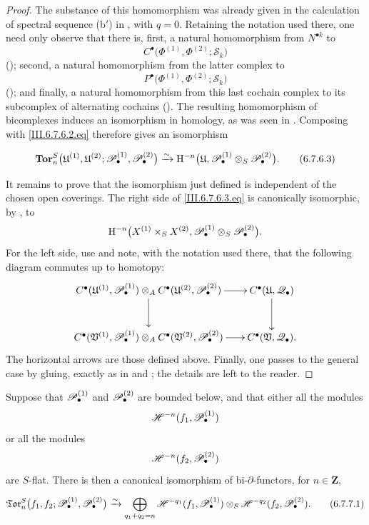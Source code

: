 \begin{proof}
The substance of this homomorphism was already given in the
calculation of spectral sequence \textnormal{(b$'$)} in
, with $q=0$.  Retaining the notation used
there, one need only observe that there is, first, a natural
homomorphism from $N^{\bullet k}$ to
\[
  C^\bullet
  \bigl(
    \Phi^{(1)},\Phi^{(2)};\mathcal S_k
  \bigr)
\]
(); second, a natural homomorphism from the
latter complex to
\[
  P^\bullet
  \bigl(
    \Phi^{(1)},\Phi^{(2)};\mathcal S_k
  \bigr)
\]
(); and finally, a natural homomorphism from
this last cochain complex to its subcomplex of alternating
cochains ().  The resulting homomorphism of
bicomplexes induces an isomorphism in homology, as was seen in
.  Composing with
\eqref{III.6.7.6.2.eq} therefore gives an isomorphism
\begin{env}[6.7.6.3]
\label{III.6.7.6.3}
\[
  \mathbf{Tor}_n^S
  \bigl(
    \mathfrak U^{(1)},\mathfrak U^{(2)};
    \mathscr{P}_\bullet^{(1)},\mathscr{P}_\bullet^{(2)}
  \bigr)
  \xrightarrow{\sim}
  \mathrm{H}^{-n}
  \bigl(
    \mathfrak U,
    \mathscr{P}_\bullet^{(1)}
    \otimes_S\mathscr{P}_\bullet^{(2)}
  \bigr).
  \tag{6.7.6.3}\label{III.6.7.6.3.eq}
\]
\end{env}

It remains to prove that the isomorphism just defined is
independent of the chosen open coverings.  The right side of
\eqref{III.6.7.6.3.eq} is canonically isomorphic, by
, to
\[
  \mathrm{H}^{-n}
  \bigl(
    X^{(1)}\times_SX^{(2)},
    \mathscr{P}_\bullet^{(1)}
    \otimes_S\mathscr{P}_\bullet^{(2)}
  \bigr).
\]
For the left side, use  and note, with the
notation used there, that the following diagram commutes up to
homotopy:
\[
\xymatrix@C=18pt@R=28pt{
  C^\bullet(\mathfrak U^{(1)},\sh P_\bullet^{(1)})
  \otimes_A
  C^\bullet(\mathfrak U^{(2)},\sh P_\bullet^{(2)})
  \ar[r]\ar[d]
  &
  C^\bullet(\mathfrak U,\sh Q_\bullet)
  \ar[d]
  \\
  C^\bullet(\mathfrak V^{(1)},\sh P_\bullet^{(1)})
  \otimes_A
  C^\bullet(\mathfrak V^{(2)},\sh P_\bullet^{(2)})
  \ar[r]
  &
  C^\bullet(\mathfrak V,\sh Q_\bullet).
}
\]
The horizontal arrows are those defined above.  Finally, one
passes to the general case by gluing, exactly as in
 and ; the details are left to
the reader.
\end{proof}

\begin{proposition}[6.7.7]
\label{III.6.7.7}
Suppose that $\mathscr{P}_\bullet^{(1)}$ and
$\mathscr{P}_\bullet^{(2)}$ are bounded below, and that either all the
modules
\[
  \mathscr{H}^{-n}(f_1,\mathscr{P}_\bullet^{(1)})
\]
or all the modules
\[
  \mathscr{H}^{-n}(f_2,\mathscr{P}_\bullet^{(2)})
\]
are $S$-flat.  There is then a canonical isomorphism of
bi-$\partial$-functors, for $n\in\mathbf Z$,
\begin{env}[6.7.7.1]
\label{III.6.7.7.1}
\[
  \mathfrak{Tor}_n^S
  \bigl(
    f_1,f_2;
    \mathscr{P}_\bullet^{(1)},\mathscr{P}_\bullet^{(2)}
  \bigr)
  \xrightarrow{\sim}
  \bigoplus_{q_1+q_2=n}
  \mathscr{H}^{-q_1}(f_1,\mathscr{P}_\bullet^{(1)})
  \otimes_S
  \mathscr{H}^{-q_2}(f_2,\mathscr{P}_\bullet^{(2)}).
  \tag{6.7.7.1}\label{III.6.7.7.1.eq}
\]
\end{env}
\end{proposition}

